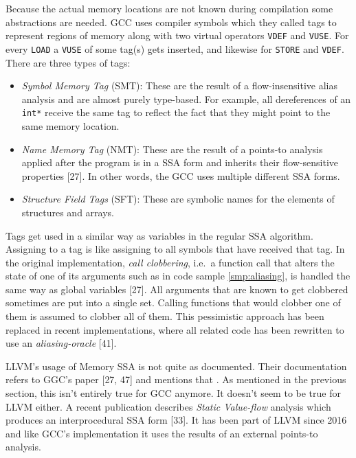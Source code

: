 \documentclass[a4paper, 16pt, oneside]{Thesis}
\providecommand{\tightlist}{%
  \setlength{\itemsep}{0pt}\setlength{\parskip}{0pt}}
\begin{document}
Because the actual memory locations are not known during compilation
some abstractions are needed. GCC uses compiler symbols which they
called tags to represent regions of memory along with two virtual
operators \texttt{VDEF} and \texttt{VUSE}. For every \texttt{LOAD} a
\texttt{VUSE} of some tag(s) gets inserted, and likewise for
\texttt{STORE} and \texttt{VDEF}. There are three types of tags:

\begin{itemize}
\tightlist
\item
  \emph{Symbol Memory Tag} (SMT): These are the result of a
  flow-insensitive alias analysis and are almost purely type-based. For
  example, all dereferences of an \texttt{int*} receive the same tag to
  reflect the fact that they might point to the same memory location.
\item
  \emph{Name Memory Tag} (NMT): These are the result of a points-to
  analysis applied after the program is in a SSA form and inherits their
  flow-sensitive properties {[}27{]}. In other words, the GCC uses
  multiple different SSA forms.
\item
  \emph{Structure Field Tags} (SFT): These are symbolic names for the
  elements of structures and arrays.
\end{itemize}

Tags get used in a similar way as variables in the regular SSA
algorithm. Assigning to a tag is like assigning to all symbols that have
received that tag. In the original implementation, \emph{call
clobbering}, i.e.~a function call that alters the state of one of its
arguments such as in code sample \ref{smp:aliasing}, is handled the same
way as global variables {[}27{]}. All arguments that are known to get
clobbered sometimes are put into a single set. Calling functions that
would clobber one of them is assumed to clobber all of them. This
pessimistic approach has been replaced in recent implementations, where
all related code has been rewritten to use an \emph{aliasing-oracle}
{[}41{]}.

LLVM's usage of Memory SSA is not quite as documented. Their
documentation refers to GGC's paper {[}27, 47{]} and mentions that
. As mentioned in
the previous section, this isn't entirely true for GCC anymore. It
doesn't seem to be true for LLVM either. A recent publication describes
\emph{Static Value-flow} analysis which produces an interprocedural SSA
form {[}33{]}. It has been part of LLVM since 2016 and like GCC's
implementation it uses the results of an external points-to analysis.
\end{document}
